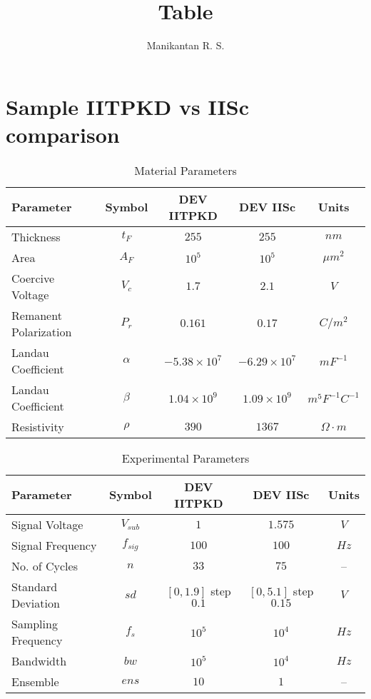 \documentclass{article}
\title{Table}
\author{Manikantan R. S.}
\date{}
\begin{document}
\maketitle

\section{Sample IITPKD vs IISc comparison}

\begin{table}[H]
\centering
\begin{tabular}{|l|c|c|c|c|}
\hline
Parameter & Symbol & DEV IITPKD & DEV IISc & Units \\
\hline
Thickness & $t_F$ & $255$ & $255$ & $nm$ \\
Area & $A_F$ & $10^5$ & $10^5$ & $\mu m^2$ \\
Coercive Voltage & $V_c$ & $1.7$ & $2.1$ & $V$ \\
Remanent Polarization & $P_r$ & $0.161$ & $0.17$ & $C/m^2$ \\
Landau Coefficient & $\alpha$ & $-5.38 \times 10^7$ & $-6.29 \times 10^7$ & $mF^{-1}$ \\
Landau Coefficient & $\beta$ & $1.04 \times 10^9$ & $1.09 \times 10^9$ & $m^5F^{-1}C^{-1}$ \\
Resistivity & $\rho$ & $390$ & $1367$ & $\Omega \cdot m$ \\
\hline
\end{tabular}
\caption{Material Parameters}
\end{table}

\begin{table}[H]
\centering
\begin{tabular}{|l|c|c|c|c|}
\hline
Parameter & Symbol & DEV IITPKD & DEV IISc & Units \\
\hline
Signal Voltage & $V_{sub}$ & $1$ & $1.575$ & $V$ \\
Signal Frequency & $f_{sig}$ & $100$ & $100$ & $Hz$ \\
No. of Cycles & $n$ & $33$ & $75$ & -- \\
Standard Deviation & $sd$ & $[0, 1.9]$ step $0.1$ & $[0, 5.1]$ step $0.15$ & $V$ \\
Sampling Frequency & $f_s$ & $10^5$ & $10^4$ & $Hz$ \\
Bandwidth & $bw$ & $10^5$ & $10^4$ & $Hz$ \\
Ensemble & $ens$ & $10$ & $1$ & -- \\
\hline
\end{tabular}
\caption{Experimental Parameters}
\end{table}
\end{document}
